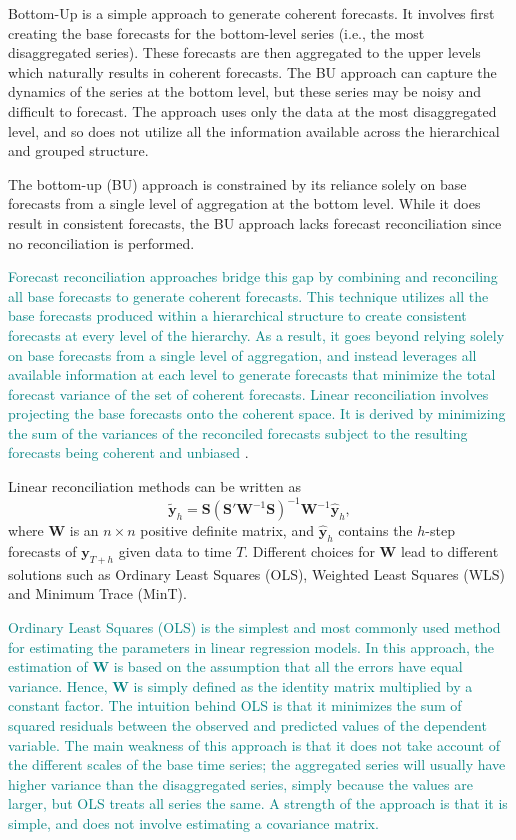\documentclass[
  authoryear,
  preprint,
  3p]{elsarticle}
\begin{document}
Bottom-Up is a simple approach to generate coherent forecasts. It
involves first creating the base forecasts for the bottom-level series
(i.e., the most disaggregated series). These forecasts are then
aggregated to the upper levels which naturally results in coherent
forecasts. The BU approach can capture the dynamics of the series at the
bottom level, but these series may be noisy and difficult to forecast.
The approach uses only the data at the most disaggregated level, and so
does not utilize all the information available across the hierarchical
and grouped structure.

The bottom-up (BU) approach is constrained by its reliance solely on
base forecasts from a single level of aggregation at the bottom level.
While it does result in consistent forecasts, the BU approach lacks
forecast reconciliation since no reconciliation is performed.

\textcolor{teal}{Forecast reconciliation approaches bridge this gap by combining and reconciling all base forecasts to generate coherent forecasts. This technique utilizes all the base forecasts produced within a hierarchical structure to create consistent forecasts at every level of the hierarchy. As a result, it goes beyond relying solely on base forecasts from a single level of aggregation, and instead leverages all available information at each level to generate forecasts that minimize the total forecast variance of the set of coherent forecasts.}
\textcolor{teal}{Linear reconciliation involves projecting the base forecasts onto the coherent space. It is derived by minimizing the sum of the variances of the reconciled forecasts subject to the resulting forecasts being coherent and unbiased}
\citep{WicEtAl2019}.

Linear reconciliation methods can be written \citep{WicEtAl2019} as \[
  \tilde{\bm{y}}_h = \bm{S}(\bm{S}'\bm{W}^{-1}\bm{S})^{-1}\bm{W}^{-1}\hat{\bm{y}}_h,
\] where \(\bm{W}\) is an \(n \times n\) positive definite matrix, and
\(\hat{\bm{y}}_h\) contains the \(h\)-step forecasts of \(\bm{y}_{T+h}\)
given data to time \(T\). Different choices for \(\bm{W}\) lead to
different solutions such as Ordinary Least Squares (OLS), Weighted Least
Squares (WLS) and Minimum Trace (MinT).

\textcolor{teal}{Ordinary Least Squares (OLS) is the simplest and most commonly used method for estimating the parameters in linear regression models. In this approach, the estimation of $\bm{W}$ is based on the assumption that all the errors have equal variance. Hence, $\bm{W}$ is simply defined as the identity matrix multiplied by a constant factor. The intuition behind OLS is that it minimizes the sum of squared residuals between the observed and predicted values of the dependent variable. The main weakness of this approach is that it does not take account of the different scales of the base time series; the aggregated series will usually have higher variance than the disaggregated series, simply because the values are larger, but OLS treats all series the same. A strength of the approach is that it is simple, and does not involve estimating a covariance matrix.}
\end{document}
